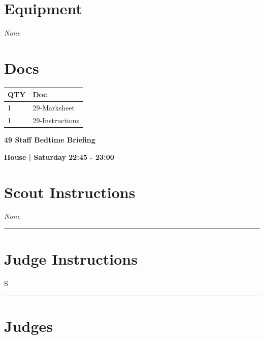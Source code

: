 \documentclass[10pt]{article}
\newcommand{\newtitle}[1]{\begin{center}{\Huge\bfseries #1 }\\ \vspace{5mm}\end{center}}
\newcommand{\newsubtitle}[1]{\begin{center}{\color{grey}\Large\bfseries #1 }\\ \vspace{5mm}\end{center}}
\begin{document}
	\begin{multicols}{2}

		\section*{\faWrench \: Equipment}

				\textit{None}
		
		\vfill\null
		\columnbreak

			\section*{\faFile \: Docs}
		 	\begin{center}
			\begin{tabular}{p{2cm}p{4cm}}

			\textbf{QTY} & \textbf{Doc} \\\toprule
										1&29-Marksheet\\\midrule
										1&29-Instructions\\\midrule
							\end{tabular}
			\end{center}
	

		\vfill\null

		\end{multicols}



	\vspace{1cm}


	\clearpage
		\newtitle{49 Staff Bedtime Briefing }
	\newsubtitle{House | Saturday 22:45 - 23:00}
		\setcounter{section}{48}
	\section*{Scout Instructions}
		\textit{None}
	
	\vspace{0.5cm}
	\hrule
	\vspace{0.5cm}

		\section*{Judge Instructions}
		S
\vspace{0.5cm}
	\hrule
	\vspace{0.5cm}
		\section*{\faUsers \: Judges}
\end{document}
